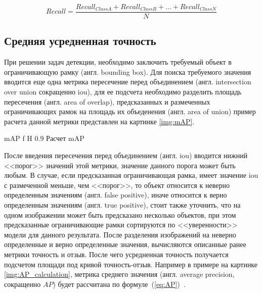 \begin{equation}
\label{eq:recall}
Recall = \frac{Recall_{Class A} + Recall_{Class B} + ... + Recall_{Class N}}{N}
\end{equation}




\subsection{Средняя усредненная точность}
При решении задач детекции, необходимо заключить требуемый объект в ограничивающую рамку (англ. bounding box).
Для поиска требуемого значения вводится еще одна метрика пересечение перед объединением (англ. intersection over union сокращенно iou),
для ее подсчета необходимо разделить площадь пересечения (англ. area of overlap), предсказанных и  размеченных ограничивающих рамок на площадь их объеденения (англ. area of union)
пример расчета данной метрики представлен на картинке \ref{img:mAP}.

{mAP} %
{f} %
{H} %
{0.9\textwidth} %
{Расчет mAP} %


После введения пересечения перед объединением (англ. iou) вводится нижний <<порог>>  значений этой метрики, значение данного порога может быть любым. В случае, 
если предсказанная ограничивающая рамка, имеет значение iou с размеченной меньше, чем <<порог>>, то объект относится  к неверно определенным значениям (англ. false positive), 
иначе относится к верно определенным значениям (англ. true positive), стоит также уточнить, что на одном изображении может быть предсказано несколько объектов, при этом предсказанные ограничивающие рамки сортируются по <<уверенности>> модели для данного результата.
После разделения изображений на неверно определенные и верно определенные значения, вычисляются описанные ранее метрики точность и отзыв.
После чего усредненная точность получается подсчетом площади под кривой точность-отзыв. Например в примере на картинке \ref{img:AP_calculation}, метрика
среднего значения (англ. average precision, сокращенно $AP$) будет рассчитана по формуле~(\ref{eq:AP})~\cite{mAP}.

